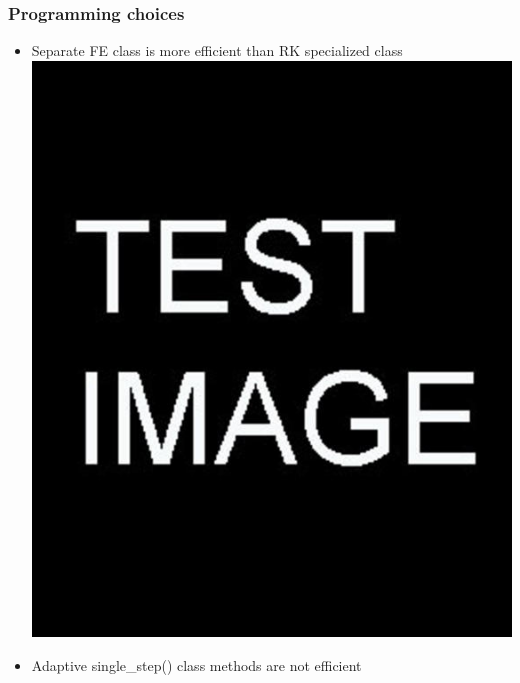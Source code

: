 \documentclass{beamer}
\begin{document}
\begin{frame} %
	\frametitle{Programming choices}
	\begin{itemize}
		\item Separate FE class is more efficient than RK specialized class
		\includegraphics[scale=0.3]{etc/test.jpg}
		\item Adaptive single\_step() class methods are not efficient
	\end{itemize}
	
\end{frame}
\end{document}
